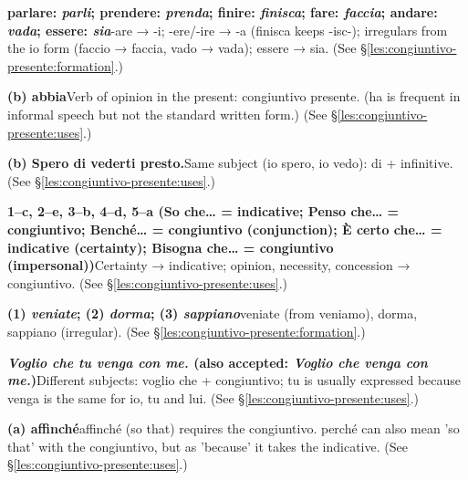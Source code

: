 \documentclass[11pt,a4paper,twoside,openright]{book}
\newcommand{\answerheading}[1]{\par\medskip\noindent{\sffamily\bfseries\small #1}\par\nopagebreak}
\begin{document}
\answerheading{\S\ref{les:congiuntivo-presente} Congiuntivo presente: forms and main uses}\label{ans:congiuntivo-presente}
\begin{answers}
\item\relax \textbf{parlare: \textit{parli}; prendere: \textit{prenda}; finire: \textit{finisca}; fare: \textit{faccia}; andare: \textit{vada}; essere: \textit{sia}}\newline -are → -i; -ere/-ire → -a (finisca keeps -isc-); irregulars from the io form (faccio → faccia, vado → vada); essere → sia. {\color{muted}(See \S\ref{les:congiuntivo-presente:formation}.)}
\item\relax \textbf{(b) abbia}\newline Verb of opinion in the present: congiuntivo presente. (ha is frequent in informal speech but not the standard written form.) {\color{muted}(See \S\ref{les:congiuntivo-presente:uses}.)}
\item\relax \textbf{(b) Spero di vederti presto.}\newline Same subject (io spero, io vedo): di + infinitive. {\color{muted}(See \S\ref{les:congiuntivo-presente:uses}.)}
\item\relax \textbf{1--c, 2--e, 3--b, 4--d, 5--a {\color{muted}(So che… = indicative; Penso che… = congiuntivo; Benché… = congiuntivo (conjunction); È certo che… = indicative (certainty); Bisogna che… = congiuntivo (impersonal))}}\newline Certainty → indicative; opinion, necessity, concession → congiuntivo. {\color{muted}(See \S\ref{les:congiuntivo-presente:uses}.)}
\item\relax \textbf{(1) \textit{veniate}; (2) \textit{dorma}; (3) \textit{sappiano}}\newline veniate (from veniamo), dorma, sappiano (irregular). {\color{muted}(See \S\ref{les:congiuntivo-presente:formation}.)}
\item\relax \textbf{\textit{Voglio che tu venga con me.} {\color{muted}(also accepted: \textit{Voglio che venga con me.})}}\newline Different subjects: voglio che + congiuntivo; tu is usually expressed because venga is the same for io, tu and lui. {\color{muted}(See \S\ref{les:congiuntivo-presente:uses}.)}
\item\relax \textbf{(a) affinché}\newline affinché (so that) requires the congiuntivo. perché can also mean 'so that' with the congiuntivo, but as 'because' it takes the indicative. {\color{muted}(See \S\ref{les:congiuntivo-presente:uses}.)}
\end{answers}
\end{document}
